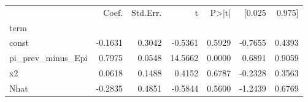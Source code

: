 \begin{tabular}{lrrrrrr}
\toprule
 & Coef. & Std.Err. & t & P>|t| & [0.025 & 0.975] \\
term &  &  &  &  &  &  \\
\midrule
const & -0.1631 & 0.3042 & -0.5361 & 0.5929 & -0.7655 & 0.4393 \\
pi_prev_minus_Epi & 0.7975 & 0.0548 & 14.5662 & 0.0000 & 0.6891 & 0.9059 \\
x2 & 0.0618 & 0.1488 & 0.4152 & 0.6787 & -0.2328 & 0.3563 \\
Nhat & -0.2835 & 0.4851 & -0.5844 & 0.5600 & -1.2439 & 0.6769 \\
\bottomrule
\end{tabular}
